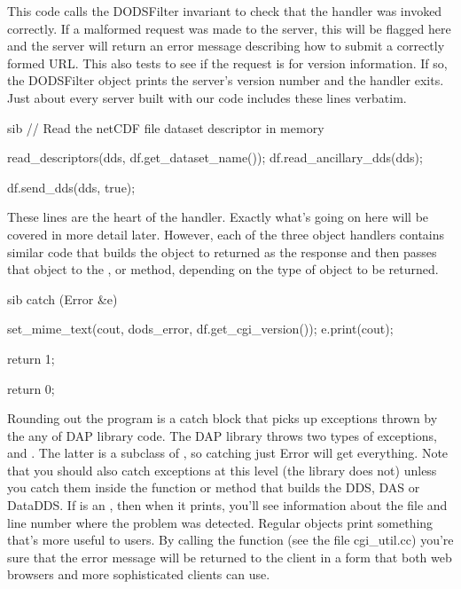 \documentclass{dods-paper}
\begin{document}
\begin{vcode}{sib}
try {
   if (!df.OK()) {
         df.print_usage();
         return 1
   }
   
   if (df.version()) {
         df.send_version_info();
         return 0;
   }
\end{vcode}  

This code calls the DODSFilter invariant to check that the handler was
invoked correctly. If a malformed request was made to the server, this
will be flagged here and the server will return an error message
describing how to submit a correctly formed URL. This also tests to
see if the request is for version information. If so, the
DODSFilter object prints the server's version number and the handler
exits. Just about every server built with our code includes these
lines verbatim.

\begin{vcode}{sib}  
   // Read the netCDF file dataset descriptor in memory

   read_descriptors(dds, df.get_dataset_name());
   df.read_ancillary_dds(dds);

   df.send_dds(dds, true);
\end{vcode}  
 
These lines are the heart of the handler. Exactly what's going on here
will be covered in more detail later. However, each of the three
object handlers contains similar code that builds the object to
returned as the response and then passes that object to the
,  or 
method, depending on the type of object to be returned.

\begin{vcode}{sib} 
   catch (Error &e) {
       set_mime_text(cout, dods_error, df.get_cgi_version());
       e.print(cout);

       return 1;
   }

   return 0;
\end{vcode}
  
Rounding out the program is a catch block that picks up exceptions thrown by
the any of DAP library code. The DAP library throws two types of exceptions,
 and . The latter is a subclass of ,
so catching just Error will get everything. Note that you should also catch
 exceptions at this level (the library does not) unless you
catch them inside the function or method that builds the DDS, DAS or DataDDS.
If  is an , then when it prints, you'll see
information about the file and line number where the problem was detected.
Regular  objects print something that's more useful to users. By
calling the  function (see the file cgi\_util.cc) you're
sure that the error message will be returned to the client in a form that
both web browsers and more sophisticated clients can use.
\end{document}
